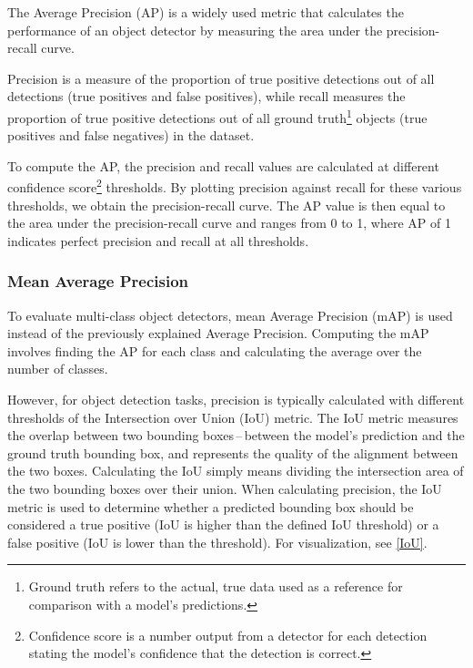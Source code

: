 The Average Precision (AP) is a widely used metric that calculates the
performance of an object detector by measuring the area under the
precision-recall curve.

Precision is a measure of the proportion of true positive detections out of all
detections (true positives and false positives), while recall measures the
proportion of true positive detections out of all ground truth\footnote{Ground
truth refers to the actual, true data used as a reference for comparison with a
model's predictions.} objects (true positives and false negatives) in the
dataset.

To compute the AP, the precision and recall values are calculated at different
confidence score\footnote{Confidence score is a number output from a detector
for each detection stating the model's confidence that the detection is
correct.} thresholds. By plotting precision against recall for these various
thresholds, we obtain the precision-recall curve. The AP value is then equal to
the area under the precision-recall curve and ranges from 0 to 1, where AP of 1
indicates perfect precision and recall at all thresholds.




\subsubsection{Mean Average Precision}


To evaluate multi-class object detectors, mean Average Precision (mAP) is used
instead of the previously explained Average Precision. Computing the mAP
involves finding the AP for each class and calculating the average over the
number of classes.

However, for object detection tasks, precision is typically calculated with
different thresholds of the Intersection over Union (IoU) metric. The IoU metric
measures the overlap between two bounding boxes\,--\,between the model's
prediction and the ground truth bounding box, and represents the quality of the alignment
between the two boxes. Calculating the IoU simply means dividing the
intersection area of the two bounding boxes over their union. When calculating
precision, the IoU metric is used to determine whether a predicted bounding box
should be considered a true positive (IoU is higher than the defined IoU
threshold) or a false positive (IoU is lower than the threshold). For
visualization, see \autoref{IoU}.

